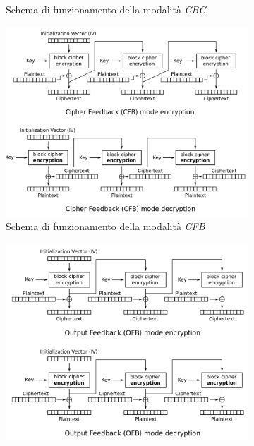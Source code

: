 \begin{figure}[h!b]
\begin{subfigure}{0.48\textwidth}
        \caption{Schema di funzionamento della modalità \emph{CBC}}
        \label{fig:aes-cbc}
    \end{subfigure}
    \begin{subfigure}{0.48\textwidth}
        \includegraphics[width=1\textwidth]{capitoli/figure-crittografia/aes-cfb.png}
        \caption{Schema di funzionamento della modalità \emph{CFB}}
        \label{fig:aes-cfb}
    \end{subfigure}
    \begin{subfigure}{0.48\textwidth}
        \includegraphics[width=1\textwidth]{capitoli/figure-crittografia/aes-ofb.png}

\end{subfigure}
\end{figure}

